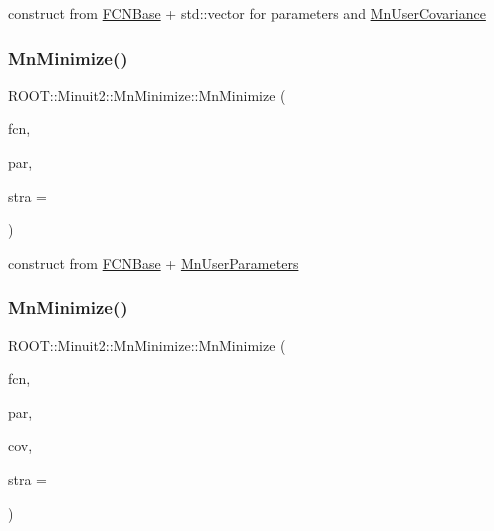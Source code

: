 construct from \mbox{\hyperlink{classROOT_1_1Minuit2_1_1FCNBase}{F\+C\+N\+Base}} + std\+::vector for parameters and \mbox{\hyperlink{classROOT_1_1Minuit2_1_1MnUserCovariance}{Mn\+User\+Covariance}} 

\mbox{\label{classROOT_1_1Minuit2_1_1MnMinimize_a0d930638a3d23f7ca1a8dc3f016a4730}} 
\subsubsection{\texorpdfstring{MnMinimize()}{MnMinimize()}\hspace{0.1cm}{\footnotesize\ttfamily [4/26]}}
{\footnotesize\ttfamily R\+O\+O\+T\+::\+Minuit2\+::\+Mn\+Minimize\+::\+Mn\+Minimize (\begin{DoxyParamCaption}\item[{const \mbox{\hyperlink{classROOT_1_1Minuit2_1_1FCNBase}{F\+C\+N\+Base}} \&}]{fcn,  }\item[{const \mbox{\hyperlink{classROOT_1_1Minuit2_1_1MnUserParameters}{Mn\+User\+Parameters}} \&}]{par,  }\item[{unsigned int}]{stra = {} }\end{DoxyParamCaption})\hspace{0.3cm}{\ttfamily [inline]}}



construct from \mbox{\hyperlink{classROOT_1_1Minuit2_1_1FCNBase}{F\+C\+N\+Base}} + \mbox{\hyperlink{classROOT_1_1Minuit2_1_1MnUserParameters}{Mn\+User\+Parameters}} 

\mbox{\label{classROOT_1_1Minuit2_1_1MnMinimize_a0f9bbcbd7bd87cb2f613f8d01ef49d86}} 
\subsubsection{\texorpdfstring{MnMinimize()}{MnMinimize()}\hspace{0.1cm}{\footnotesize\ttfamily [5/26]}}
{\footnotesize\ttfamily R\+O\+O\+T\+::\+Minuit2\+::\+Mn\+Minimize\+::\+Mn\+Minimize (\begin{DoxyParamCaption}\item[{const \mbox{\hyperlink{classROOT_1_1Minuit2_1_1FCNBase}{F\+C\+N\+Base}} \&}]{fcn,  }\item[{const \mbox{\hyperlink{classROOT_1_1Minuit2_1_1MnUserParameters}{Mn\+User\+Parameters}} \&}]{par,  }\item[{const \mbox{\hyperlink{classROOT_1_1Minuit2_1_1MnUserCovariance}{Mn\+User\+Covariance}} \&}]{cov,  }\item[{unsigned int}]{stra = {} }\end{DoxyParamCaption})\hspace{0.3cm}{\ttfamily [inline]}}



